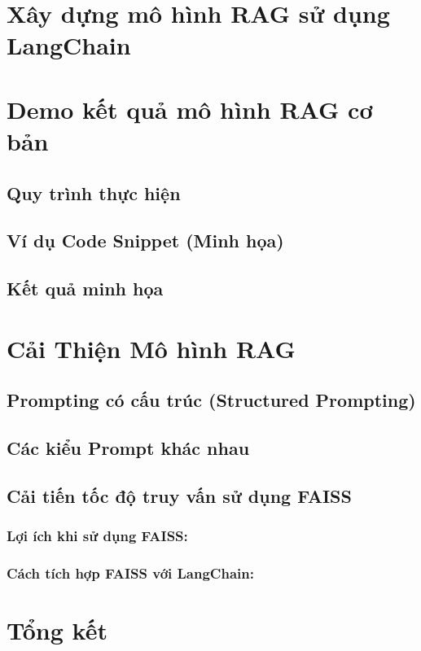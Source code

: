 \documentclass[11pt]{article}
\begin{document}
\section{Xây dựng mô hình RAG sử dụng LangChain}

\section{Demo kết quả mô hình RAG cơ bản}
\subsection*{Quy trình thực hiện}

\subsection*{Ví dụ Code Snippet (Minh họa)}
\subsection*{Kết quả minh họa}

\section{Cải Thiện Mô hình RAG}

\subsection{Prompting có cấu trúc (Structured Prompting)}

\subsection{Các kiểu Prompt khác nhau}
\subsection{Cải tiến tốc độ truy vấn sử dụng FAISS}

\subsubsection*{Lợi ích khi sử dụng FAISS:}

\subsubsection*{Cách tích hợp FAISS với LangChain:}

\section{Tổng kết}
\end{document}
